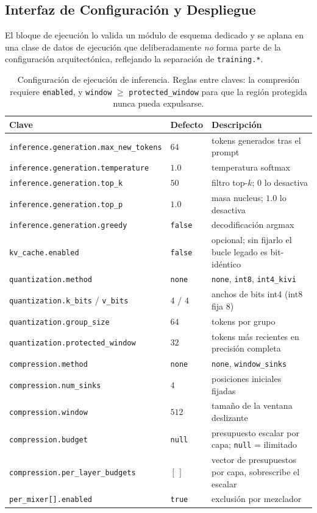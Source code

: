 \subsection{Interfaz de Configuración y Despliegue}
\label{sec:kv-config}

El bloque de ejecución lo valida un módulo de esquema dedicado y se aplana en una clase de datos de ejecución que deliberadamente \emph{no} forma parte de la configuración arquitectónica, reflejando la separación de \texttt{training.*}.

\begin{table}[H]
\centering
\small
\begin{tabularx}{0.98\linewidth}{l l X}
\toprule
\textbf{Clave} & \textbf{Defecto} & \textbf{Descripción} \\
\midrule
\texttt{inference.generation.max\_new\_tokens} & $64$ & tokens generados tras el prompt \\
\texttt{inference.generation.temperature} & $1.0$ & temperatura softmax \\
\texttt{inference.generation.top\_k} & $50$ & filtro top-$k$; $0$ lo desactiva \\
\texttt{inference.generation.top\_p} & $1.0$ & masa nucleus; $1.0$ lo desactiva \\
\texttt{inference.generation.greedy} & \texttt{false} & decodificación argmax \\
\midrule
\texttt{kv\_cache.enabled} & \texttt{false} & opcional; sin fijarlo el bucle legado es bit-idéntico \\
\texttt{quantization.method} & \texttt{none} & \texttt{none}, \texttt{int8}, \texttt{int4\_kivi} \\
\texttt{quantization.k\_bits} / \texttt{v\_bits} & $4$ / $4$ & anchos de bits int4 (int8 fija 8) \\
\texttt{quantization.group\_size} & $64$ & tokens por grupo \\
\texttt{quantization.protected\_window} & $32$ & tokens más recientes en precisión completa \\
\texttt{compression.method} & \texttt{none} & \texttt{none}, \texttt{window\_sinks} \\
\texttt{compression.num\_sinks} & $4$ & posiciones iniciales fijadas \\
\texttt{compression.window} & $512$ & tamaño de la ventana deslizante \\
\texttt{compression.budget} & \texttt{null} & presupuesto escalar por capa; \texttt{null} = ilimitado \\
\texttt{compression.per\_layer\_budgets} & $[\,]$ & vector de presupuestos por capa, sobrescribe el escalar \\
\texttt{per\_mixer[].enabled} & \texttt{true} & exclusión por mezclador \\
\bottomrule
\end{tabularx}
\caption{Configuración de ejecución de inferencia. Reglas entre claves: la compresión requiere \texttt{enabled}, y \texttt{window} $\ge$ \texttt{protected\_window} para que la región protegida nunca pueda expulsarse.}
\label{tab:kv-config}
\end{table}

